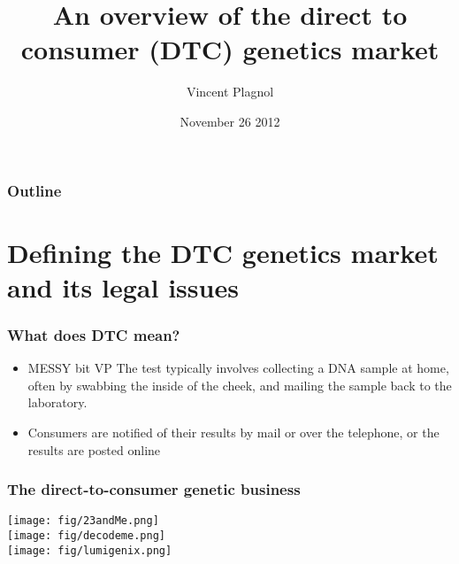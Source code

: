 \documentclass{beamer}
\title[]{An overview of the direct to consumer (DTC) genetics market}
\author[]{Vincent Plagnol}
\date{November 26 2012}
\institute{UCL Genetics Institute}
\begin{document}
\begin{frame}
  \titlepage
\end{frame}


\begin{frame}
 \frametitle{Outline}
 \tableofcontents
\end{frame}





\section{Defining the DTC genetics market and its legal issues}


\begin{frame}
  \frametitle{What does DTC mean?}
  \begin{itemize}
    \begin{itemize}
    \item MESSY bit VP The test typically involves collecting a DNA sample at home, often by swabbing the inside of the cheek, and mailing the sample back to the laboratory.
    \item Consumers are notified of their results by mail or over the telephone, or the results are posted online
    \end{itemize}
  \end{itemize}
\end{frame}



\begin{frame}
  \frametitle{The direct-to-consumer genetic business}
   \begin{center}
     \texttt{[image: fig/23andMe.png]}\\
     \vspace{1cm}
     \texttt{[image: fig/decodeme.png]}\\
     \vspace{1cm}
     \texttt{[image: fig/lumigenix.png]}\\
  \end{center}
\end{frame}



\end{document}
